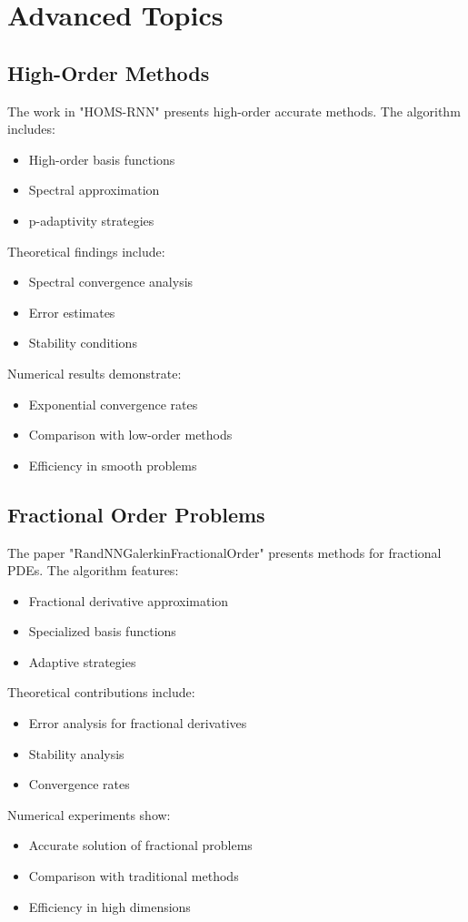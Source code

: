 \documentclass[12pt]{article}
\begin{document}
\section{Advanced Topics}
\label{sec:advanced}

\subsection{High-Order Methods}
\label{subsec:high_order}
The work in "HOMS-RNN" presents high-order accurate methods. The algorithm includes:
\begin{itemize}
    \item High-order basis functions
    \item Spectral approximation
    \item p-adaptivity strategies
\end{itemize}
Theoretical findings include:
\begin{itemize}
    \item Spectral convergence analysis
    \item Error estimates
    \item Stability conditions
\end{itemize}
Numerical results demonstrate:
\begin{itemize}
    \item Exponential convergence rates
    \item Comparison with low-order methods
    \item Efficiency in smooth problems
\end{itemize}

\subsection{Fractional Order Problems}
\label{subsec:fractional}
The paper "RandNNGalerkinFractionalOrder" presents methods for fractional PDEs. The algorithm features:
\begin{itemize}
    \item Fractional derivative approximation
    \item Specialized basis functions
    \item Adaptive strategies
\end{itemize}
Theoretical contributions include:
\begin{itemize}
    \item Error analysis for fractional derivatives
    \item Stability analysis
    \item Convergence rates
\end{itemize}
Numerical experiments show:
\begin{itemize}
    \item Accurate solution of fractional problems
    \item Comparison with traditional methods
    \item Efficiency in high dimensions
\end{itemize}
\end{document}
